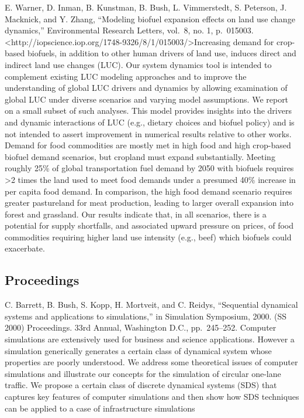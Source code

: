 \documentclass[]{article}
\begin{document}
E. Warner, D. Inman, B. Kunstman, B. Bush, L. Vimmerstedt, S. Peterson,
J. Macknick, and Y. Zhang, ``Modeling biofuel expansion effects on land
use change dynamics,'' Environmental Research Letters, vol.~8, no. 1,
p.~015003.
\textless{}http://iopscience.iop.org/1748-9326/8/1/015003/\textgreater{}Increasing
demand for crop-based biofuels, in addition to other human drivers of
land use, induces direct and indirect land use changes (LUC). Our system
dynamics tool is intended to complement existing LUC modeling approaches
and to improve the understanding of global LUC drivers and dynamics by
allowing examination of global LUC under diverse scenarios and varying
model assumptions. We report on a small subset of such analyses. This
model provides insights into the drivers and dynamic interactions of LUC
(e.g., dietary choices and biofuel policy) and is not intended to assert
improvement in numerical results relative to other works. Demand for
food commodities are mostly met in high food and high crop-based biofuel
demand scenarios, but cropland must expand substantially. Meeting
roughly 25\% of global transportation fuel demand by 2050 with biofuels
requires \textgreater{}2 times the land used to meet food demands under
a presumed 40\% increase in per capita food demand. In comparison, the
high food demand scenario requires greater pastureland for meat
production, leading to larger overall expansion into forest and
grassland. Our results indicate that, in all scenarios, there is a
potential for supply shortfalls, and associated upward pressure on
prices, of food commodities requiring higher land use intensity (e.g.,
beef) which biofuels could exacerbate.

\subsection{Proceedings}\label{proceedings}

C. Barrett, B. Bush, S. Kopp, H. Mortveit, and C. Reidys, ``Sequential
dynamical systems and applications to simulations,'' in Simulation
Symposium, 2000. (SS 2000) Proceedings. 33rd Annual, Washington D.C.,
pp.~245--252. Computer simulations are extensively used for business and
science applications. However a simulation generically generates a
certain class of dynamical system whose properties are poorly
understood. We address some theoretical issues of computer simulations
and illustrate our concepts for the simulation of circular one-lane
traffic. We propose a certain class of discrete dynamical systems (SDS)
that captures key features of computer simulations and then show how SDS
techniques can be applied to a case of infrastructure simulations
\end{document}
